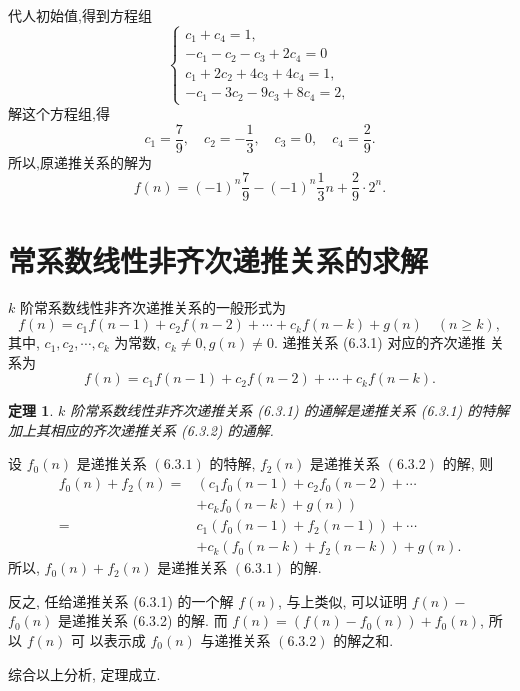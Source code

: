 \documentclass[punct]{ctexbeamer}
\newtheorem{thm}{定理}[section]
\def\pf{\noindent {\bf 证明\ }}
\begin{document}
\begin{frame}
	代人初始值,得到方程组
	$$
	\left\{\begin{array}{l}
		c_1+c_4=1, \\
		-c_1-c_2-c_3+2 c_4=0 \\
		c_1+2 c_2+4 c_3+4 c_4=1, \\
		-c_1-3 c_2-9 c_3+8 c_4=2,
	\end{array}\right.
	$$
	解这个方程组,得
	$$
	c_1=\frac{7}{9}, \quad c_2=-\frac{1}{3}, \quad c_3=0, \quad c_4=\frac{2}{9} .
	$$
	所以,原递推关系的解为
	$$
	f(n)=(-1)^n \frac{7}{9}-(-1)^n \frac{1}{3} n+\frac{2}{9} \cdot 2^n .
	$$
\end{frame}

\section{常系数线性非齐次递推关系的求解}
\begin{frame}
	$k$ 阶常系数线性非齐次递推关系的一般形式为
	\[
	f(n)=c_1 f(n-1)+c_2 f(n-2)+\cdots+c_k f(n-k)+g(n) \quad(n \geqslant k),\tag{ 6.3.1 }
	\]
	其中, $c_1, c_2, \cdots, c_k$ 为常数, $c_k \neq 0, g(n) \neq 0$. 递推关系 (6.3.1) 对应的齐次递推 关系为
	\[
	f(n)=c_1 f(n-1)+c_2 f(n-2)+\cdots+c_k f(n-k) . \tag{ 6.3.2 }
	\]
	\begin{thm}
		$k$ 阶常系数线性非齐次递推关系 (6.3.1) 的通解是递推关系 (6.3.1) 的特解加上其相应的齐次递推关系 (6.3.2) 的通解.
	\end{thm}
\end{frame}

\begin{frame}
	\pf
	设 $f_0(n)$ 是递推关系 $(6.3 .1)$ 的特解, $f_2(n)$ 是递推关系 $(6.3 .2)$ 的解,
	则
	$$
	\begin{aligned}
		f_0(n)+f_2(n)=& {\left(c_1 f_0(n-1)+c_2 f_0(n-2)+\cdots\right.} \\
		&\left.+c_k f_0(n-k)+g(n)\right) \\
		=& c_1\left(f_0(n-1)+f_2(n-1)\right)+\cdots \\
		&+c_k\left(f_0(n-k)+f_2(n-k)\right)+g(n) .
	\end{aligned}
	$$
	所以, $f_0(n)+f_2(n)$ 是递推关系 $(6.3 .1)$ 的解.

	反之, 任给递推关系 (6.3.1) 的一个解 $f(n)$, 与上类似, 可以证明 $f(n)-$ $f_0(n)$ 是递推关系 (6.3.2) 的解. 而 $f(n)=\left(f(n)-f_0(n)\right)+f_0(n)$, 所以 $f(n)$ 可 以表示成 $f_0(n)$ 与递推关系 $(6.3 .2)$ 的解之和.

	综合以上分析, 定理成立.
\end{frame}
\end{document}
